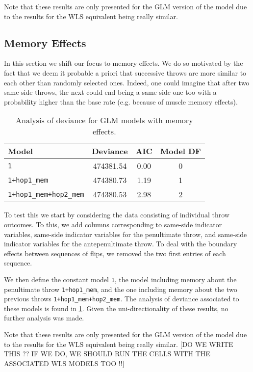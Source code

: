 \documentclass[a4paper, 12pt,oneside]{article}
\begin{document}
			Note that these results are only presented for the GLM version of the model due to the results for the WLS equivalent being really similar. 
		\subsection{Memory Effects}
			In this section we shift our focus to memory effects. We do so motivated by the fact that we deem it probable a priori that successive throws are more similar to each other than randomly selected ones. Indeed, one could imagine that after two same-side throws, the next could end being a same-side one too with a probability higher than the base rate (e.g. because of muscle memory effects). 
			\begin{table}[htb]
				\centering
				\caption{Analysis of deviance for GLM models with memory effects.}
				\label{tab:memory-model-comparison}
				\begin{tabular}{lccc}
				\toprule
				Model & Deviance & AIC & Model DF \\
				\midrule
				\texttt{1} & 474381.54 & 0.00 & 0 \\
				\texttt{1+hop1\_mem} & 474380.73 & 1.19 & 1 \\
				\texttt{1+hop1\_mem+hop2\_mem} & 474380.53 & 2.98 & 2 \\
				\bottomrule
				\end{tabular}
			\end{table}

			To test this we start by considering the data consisting of individual throw outcomes. To this, we add columns corresponding to same-side indicator variables, same-side indicator variables for the penultimate throw, and same-side indicator variables for the antepenultimate throw.
			To deal with the boundary effects between sequences of flips, we removed the two first entries of each sequence. 
			
			We then define the constant model \texttt{1}, the model including memory about the penultimate throw \texttt{1+hop1\_mem}, and the one including memory about the two previous throws \texttt{1+hop1\_mem+hop2\_mem}. The analysis of deviance associated to these models is found in \ref{tab:memory-model-comparison}. Given the uni-directionality of these results, no further analysis was made.  

			Note that these results are only presented for the GLM version of the model due to the results for the WLS equivalent being really similar. 
			[DO WE WRITE THIS ?? IF WE DO, WE SHOULD RUN THE CELLS WITH THE ASSOCIATED WLS MODELS TOO !!]
\end{document}
